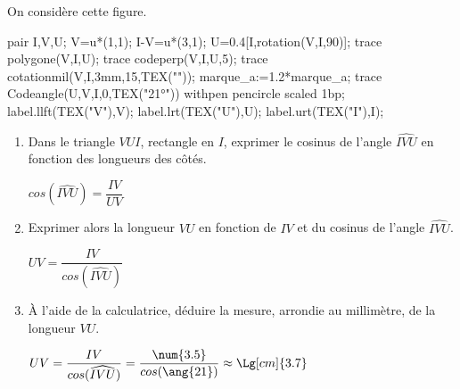 \begin{corrige}
    On considère cette figure.

    \begin{Geometrie}
        pair I,V,U;
        V=u*(1,1);
        I-V=u*(3,1);
        U=0.4[I,rotation(V,I,90)];
        trace polygone(V,I,U);
        trace codeperp(V,I,U,5);
        trace cotationmil(V,I,3mm,15,TEX(""));
        marque_a:=1.2*marque_a;                
        trace Codeangle(U,V,I,0,TEX("\ang{21}")) withpen pencircle scaled 1bp;
        label.llft(TEX("V"),V);
        label.lrt(TEX("U"),U);
        label.urt(TEX("I"),I);
    \end{Geometrie}

    \begin{enumerate}
        \item Dans le triangle $VUI$, rectangle en $I$, exprimer le cosinus de l'angle $\widehat{IVU}$ en fonction des longueurs des côtés.
        
        {\color{red} $cos(\widehat{IVU})=\dfrac{IV}{UV}$}
        \item Exprimer alors la longueur $VU$ en fonction de $IV$ et du cosinus de l'angle $\widehat{IVU}$.
        
        {\color{red} $UV=\dfrac{IV}{cos(\widehat{IVU})}$}
        \item À l'aide de la calculatrice, déduire la mesure, arrondie au millimètre, de la longueur $VU$.
        
        {\color{red} $UV=\dfrac{IV}{cos(\widehat{IVU})}=\dfrac{\num{3.5}}{cos(\ang{21})}\approx\Lg[cm]{3.7}$}
    \end{enumerate}
\end{corrige}

